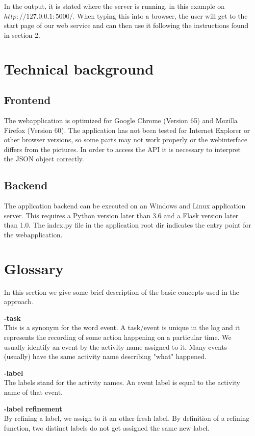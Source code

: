 \documentclass[notitlepage]{article}
\begin{document}
In the output, it is stated where the server is running, in this example on $http://127.0.0.1:5000/$. When typing this into a browser, the user will get to the start page of our web service and can then use it following the instructions found in section 2. 


\section{Technical background}

\subsection{Frontend}
The webapplication is optimized for Google Chrome (Version 65) and Mozilla Firefox (Version 60). 
The application has not been tested for Internet Explorer or other browser versions, so some parts may not work properly 
or the webinterface differs from the pictures. In order to access the API it is necessary to interpret the JSON object correctly.


\subsection{Backend}
The application backend can be executed on an Windows and Linux application server. 
This requires a Python version later than 3.6 and a Flask version later than 1.0. The index.py file in the application root dir indicates the 
entry point for the webapplication.

\section{Glossary}
In this section we give some brief description of the basic concepts used in the approach.
\medskip

\textbf{-task}\\
This is a synonym for the word event.
A task/event is unique in the log and it represents the recording of some action happening on a particular time.
We usually identify an event by the activity name assigned to it.
Many events (usually) have the same activity name describing "what" happened.
\medskip

\textbf{-label}\\
The labels stand for the activity names.
An event label is equal to the activity name of that event.
\medskip

\textbf{-label refinement}\\
By refining a label, we assign to it an other fresh label.
By definition of a refining function, two distinct labels do not get assigned the same new label.
\medskip
\end{document}
